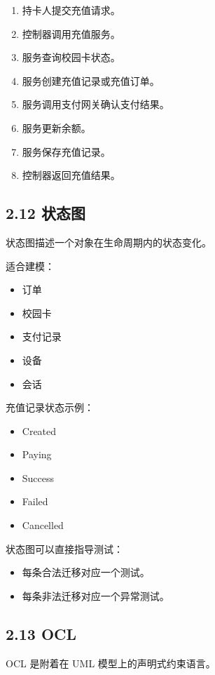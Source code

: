 \documentclass[UTF8,zihao=-4]{ctexart}
\begin{document}
\begin{enumerate}
\item 持卡人提交充值请求。
\item 控制器调用充值服务。
\item 服务查询校园卡状态。
\item 服务创建充值记录或充值订单。
\item 服务调用支付网关确认支付结果。
\item 服务更新余额。
\item 服务保存充值记录。
\item 控制器返回充值结果。
\end{enumerate}

\subsection{2.12 状态图}

状态图描述一个对象在生命周期内的状态变化。

适合建模：

\begin{itemize}
\item 订单
\item 校园卡
\item 支付记录
\item 设备
\item 会话
\end{itemize}

充值记录状态示例：

\begin{itemize}
\item Created
\item Paying
\item Success
\item Failed
\item Cancelled
\end{itemize}

状态图可以直接指导测试：

\begin{itemize}
\item 每条合法迁移对应一个测试。
\item 每条非法迁移对应一个异常测试。
\end{itemize}

\subsection{2.13 OCL}

OCL 是附着在 UML 模型上的声明式约束语言。
\end{document}

